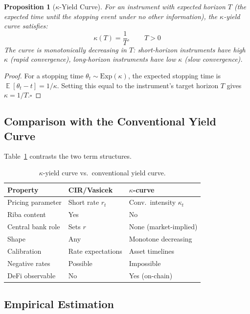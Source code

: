 \documentclass[10pt,twocolumn]{article}
\theoremstyle{plain}
\newtheorem{proposition}{Proposition}
\theoremstyle{definition}
\DeclareMathOperator{\E}{\mathbb{E}}
\begin{document}
\begin{proposition}[$\kappa$-Yield Curve]
\label{prop:kappa_curve}
For an instrument with expected horizon $T$ (the expected time
until the stopping event under no other information), the
$\kappa$-yield curve satisfies:
\begin{equation}
\kappa(T) = \frac{1}{T}, \qquad T > 0
\label{eq:kappa_curve}
\end{equation}
The curve is monotonically decreasing in $T$: short-horizon
instruments have high $\kappa$ (rapid convergence), long-horizon
instruments have low $\kappa$ (slow convergence).
\end{proposition}

\begin{proof}
For a stopping time $\theta_t \sim \mathrm{Exp}(\kappa)$,
the expected stopping time is $\E[\theta_t - t] = 1/\kappa$.
Setting this equal to the instrument's target horizon $T$
gives $\kappa = 1/T$.\qquad$\square$
\end{proof}

\subsection{Comparison with the Conventional Yield Curve}

Table~\ref{tab:yield_curve} contrasts the two term structures.

\begin{table}[h!]
\centering
\caption{$\kappa$-yield curve vs.\ conventional yield curve.}
\label{tab:yield_curve}
\small
\begin{tabular}{@{}p{2.6cm}p{2.0cm}p{2.4cm}@{}}
\toprule
\textbf{Property} & \textbf{CIR/Vasicek} & \textbf{$\kappa$-curve} \\
\midrule
Pricing parameter & Short rate $r_t$ & Conv.\ intensity $\kappa_t$ \\
Riba content & Yes & No \\
Central bank role & Sets $r$ & None (market-implied) \\
Shape & Any & Monotone decreasing \\
Calibration & Rate expectations & Asset timelines \\
Negative rates & Possible & Impossible \\
DeFi observable & No & Yes (on-chain) \\
\bottomrule
\end{tabular}
\end{table}

\subsection{Empirical Estimation}
\end{document}
